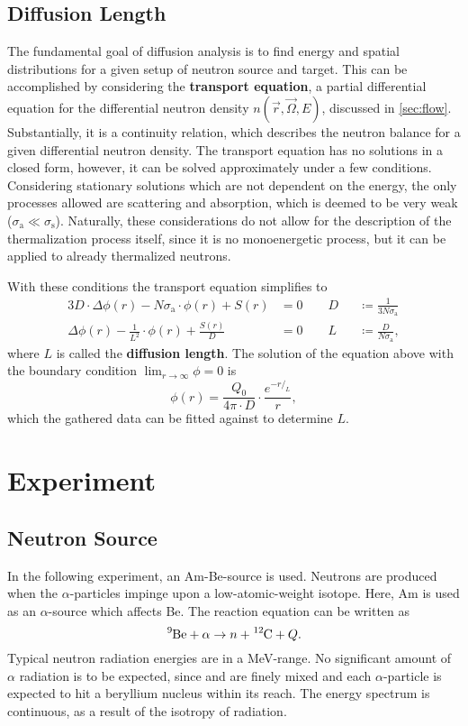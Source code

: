 \section{Diffusion Length}
The fundamental goal of diffusion analysis is to find energy and spatial distributions for a given setup of neutron source and target.
This can be accomplished by considering the \textbf{transport equation}, a partial differential equation for the differential neutron density $n(\vec{r}, \vec{\Omega}, E)$, discussed in \autoref{sec:flow}.
Substantially, it is a continuity relation, which describes the neutron balance for a given differential neutron density.
The transport equation has no solutions in a closed form, however, it can be solved approximately under a few conditions.
Considering stationary solutions which are not dependent on the energy, the only processes allowed are scattering and absorption, which is deemed to be very weak ($\sigma_\text{a}\ll \sigma_\text{s}$).
Naturally, these considerations do not allow for the description of the thermalization process itself, since it is no monoenergetic process, but it can be applied to already thermalized neutrons.

With these conditions the transport equation simplifies to
\begin{alignat*}{3}
	D\cdot\Delta\phi(r) - N\sigma_\text{a}\cdot\phi(r) + S(r) &= 0 \qquad D&&\coloneqq\frac{1}{3N\sigma_\text{a}}\\
	\Delta\phi(r) - \frac{1}{L^2}\cdot\phi(r) + \frac{S(r)}{D} &= 0 \qquad L&&\coloneqq\frac{D}{N\sigma_\text{a}},
\end{alignat*}
where $L$ is called the \textbf{diffusion length}.
The solution of the equation above with the boundary condition $\lim_{r\rightarrow\infty}\phi = 0$ is
\begin{equation}\label{eq:sol}
	\phi(r) = \frac{Q_0}{4\pi\cdot D}\cdot \frac{e^{-r/_L}}{r},
\end{equation}
which the gathered data can be fitted against to determine $L$.

\chapter{Experiment}
\section{Neutron Source}
In the following experiment, an Am-Be-source is used.
Neutrons are produced when the $\alpha$-particles impinge upon a low-atomic-weight isotope.
Here, Am is used as an $\alpha$-source which affects Be.
The reaction equation can be written as
\begin{equation*}
	\ce{^{9}Be} + \alpha \rightarrow n + \ce{^{12}C} + Q.
\end{equation*}
Typical neutron radiation energies are in a \si{MeV}-range.
No significant amount of $\alpha$ radiation is to be expected, since  and  are finely mixed and each $\alpha$-particle is expected to hit a beryllium nucleus within its reach.
The energy spectrum is continuous, as a result of the isotropy of radiation.

